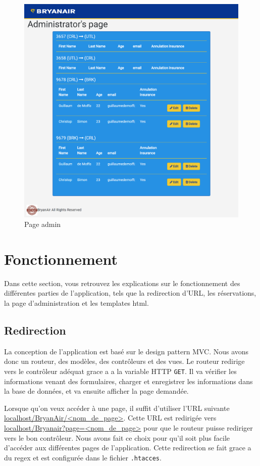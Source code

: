 \documentclass[12pt,a4paper]{article}
\begin{document}
		\begin{figure}
      \includegraphics[width=\textwidth]{admin.png}
			\caption{Page admin}
			\label{fig:admin}
		\end{figure}

	\section{Fonctionnement}
		Dans cette section, vous retrouvez les explications sur le fonctionnement des différentes parties de l'application, tels que la redirection d'URL, les réservations, la page d'administration et les templates html.
		\subsection*{Redirection}
		La conception de l'application est basé sur le design pattern MVC. Nous avons donc un routeur, des modèles, des contrôleurs et des vues. Le routeur redirige vers le contrôleur adéquat grace a a la variable HTTP \texttt{GET}. Il va vérifier les informations venant des formulaires, charger et enregistrer les informations dans la base de données, et va ensuite afficher la page demandée.

		Lorsque qu'on veux accéder à une page, il suffit d'utiliser l'URL suivante \url{localhost/BryanAir/<nom_de_page>}. Cette URL est redirigée vers \url{localhost/Bryanair?page=<nom_de_page>} pour que le routeur puisse rediriger vers le bon contrôleur. Nous avons fait ce choix pour qu'il soit plus facile d'accéder aux différentes pages de l'application. Cette redirection se fait grace a du regex et est configurée dans le fichier \texttt{.htacces}.
\end{document}
